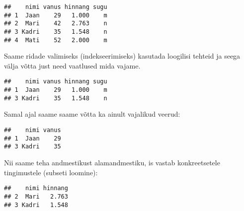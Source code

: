 \documentclass[
]{book}
\newenvironment{Shaded}{\begin{snugshade}}{\end{snugshade}}
\newcommand{\DecValTok}[1]{\textcolor[rgb]{0.00,0.00,0.81}{#1}}
\newcommand{\FunctionTok}[1]{\textcolor[rgb]{0.00,0.00,0.00}{#1}}
\newcommand{\NormalTok}[1]{#1}
\newcommand{\OtherTok}[1]{\textcolor[rgb]{0.56,0.35,0.01}{#1}}
\newcommand{\SpecialCharTok}[1]{\textcolor[rgb]{0.00,0.00,0.00}{#1}}
\newcommand{\StringTok}[1]{\textcolor[rgb]{0.31,0.60,0.02}{#1}}
\begin{document}
\begin{verbatim}
##    nimi vanus hinnang sugu
## 1  Jaan    29   1.000    m
## 2  Mari    42   2.763    n
## 3 Kadri    35   1.548    n
## 4  Mati    52   2.000    m
\end{verbatim}

Saame ridade valimiseks (indekseerimiseks) kasutada loogilisi tehteid ja seega välja võtta just need vaatlused mida vajame.

\begin{Shaded}
\end{Shaded}

\begin{verbatim}
##    nimi vanus hinnang sugu
## 1  Jaan    29   1.000    m
## 3 Kadri    35   1.548    n
\end{verbatim}

Samal ajal saame saame võtta ka ainult vajalikud veerud:

\begin{Shaded}
\end{Shaded}

\begin{verbatim}
##    nimi vanus
## 1  Jaan    29
## 3 Kadri    35
\end{verbatim}

Nii saame teha andmestikust alamandmestiku, is vastab konkreetsetele tingimustele (subseti loomine):

\begin{Shaded}
\end{Shaded}

\begin{verbatim}
##    nimi hinnang
## 2  Mari   2.763
## 3 Kadri   1.548
\end{verbatim}
\end{document}
